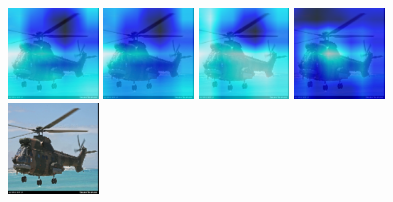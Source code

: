\begin{figure}[H]
\centering
{}
  {\includegraphics[height=2.4cm, width=2.4cm]{images/real-images/gradcam/5-1/1/Heat_map_of_iterations_0.png}}
  {\includegraphics[height=2.4cm, width=2.4cm]{images/real-images/gradcam/5-1/1/Heat_map_of_iterations_1.png}}
  {\includegraphics[height=2.4cm, width=2.4cm]{images/real-images/gradcam/5-1/1/Heat_map_of_iterations_3.png}}
%
  {\includegraphics[height=2.4cm, width=2.4cm]{images/real-images/gradcam/5-1/1/Heat_map_of_iterations_5.png}}
  {\includegraphics[height=2.4cm, width=2.4cm]{images/real-images/gradcam/5-1/1/Test_Images.png}}



\end{figure}
